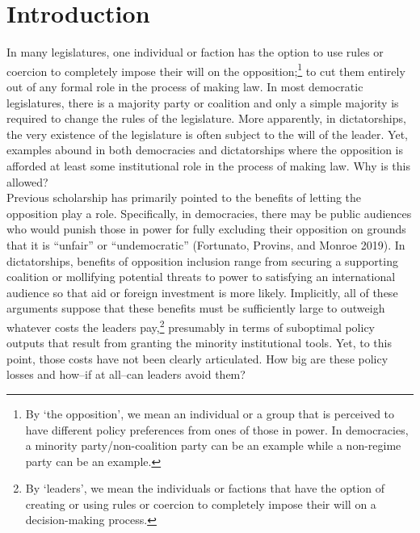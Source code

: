 \documentclass[12pt]{article}
\theoremstyle{plain}		      \newtheorem{assn}{Assumption}
\theoremstyle{plain}		      \newtheorem{prop}{Proposition}
\theoremstyle{plain}		      \newtheorem{lemma}{Lemma}
\theoremstyle{plain}	          \newtheorem{imp}{Implication}
\theoremstyle{plain}	          \newtheorem{hyp}{Hypothesis}
\theoremstyle{definition}		  \newtheorem{defn}{Definition}
\theoremstyle{remark}	          \newtheorem{rem}{Remark}
\theoremstyle{definition}         \newtheorem{case}{Case}
\begin{document}
\section{Introduction}
\indent In many legislatures, one individual or faction has the option to use rules or coercion to completely impose their will on the opposition;\footnote{By `the opposition', we mean an individual or a group that is perceived to have different policy preferences from ones of those in power. In democracies, a minority party/non-coalition party can be an example while a non-regime party can be an example.} to cut them entirely out of any formal role in the process of making law. In most democratic legislatures, there is a majority party or coalition and only a simple majority is required to change the rules of the legislature. More apparently, in dictatorships, the very existence of the legislature is often subject to the will of the leader. Yet, examples abound in both democracies and dictatorships where the opposition is afforded at least some institutional role in the process of making law. Why is this allowed?
\\
\indent Previous scholarship has primarily pointed to the benefits of letting the opposition play a role. Specifically, in democracies, there may be public audiences who would punish those in power for fully excluding their opposition on grounds that it is ``unfair'' or ``undemocratic'' (Fortunato, Provins, and Monroe 2019). In dictatorships, benefits of opposition inclusion range from securing a supporting coalition \citep{svolik12} or mollifying potential threats to power \citep{gandhi08} to satisfying an international audience so that aid or foreign investment \citep{levitskyway10} is more likely. Implicitly, all of these arguments suppose that these benefits must be sufficiently large to outweigh whatever costs the leaders pay,\footnote{By `leaders', we mean the individuals or factions that have the option of creating or using rules or coercion to completely impose their will on a decision-making process. } presumably in terms of suboptimal policy outputs that result from granting the minority institutional tools. Yet, to this point, those costs have not been clearly articulated. How big are these policy losses and how--if at all--can leaders avoid them?
\\
\end{document}
